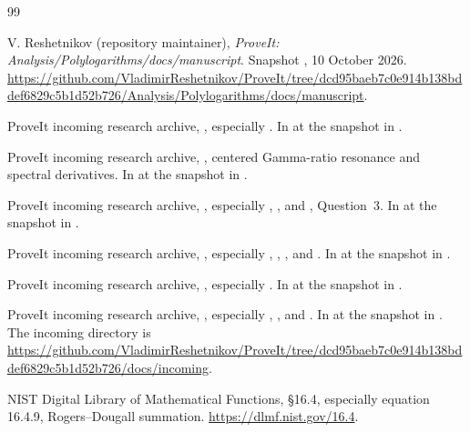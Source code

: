 \begin{thebibliography}{99}
\raggedright
{}

V. Reshetnikov (repository maintainer),
\emph{ProveIt: Analysis/Polylogarithms/docs/manuscript}.
Snapshot ,
10 October 2026.
\url{https://github.com/VladimirReshetnikov/ProveIt/tree/dcd95baeb7c0e914b138bddef6829c5b1d52b726/Analysis/Polylogarithms/docs/manuscript}.

ProveIt incoming research archive,
,
especially .
In  at the snapshot in \cite{RepoMain}.

ProveIt incoming research archive,
,
centered Gamma-ratio resonance and spectral derivatives.
In  at the snapshot in \cite{RepoMain}.

ProveIt incoming research archive,
,
especially ,
, and
, Question~3.
In  at the snapshot in \cite{RepoMain}.

ProveIt incoming research archive,
,
especially ,
, ,
and .
In  at the snapshot in \cite{RepoMain}.

ProveIt incoming research archive,
,
especially .
In  at the snapshot in \cite{RepoMain}.

ProveIt incoming research archive,
,
especially ,
, and
.
In  at the snapshot in \cite{RepoMain}.
The incoming directory is
\url{https://github.com/VladimirReshetnikov/ProveIt/tree/dcd95baeb7c0e914b138bddef6829c5b1d52b726/docs/incoming}.

NIST Digital Library of Mathematical Functions,
\S16.4, especially equation 16.4.9, Rogers--Dougall summation.
\url{https://dlmf.nist.gov/16.4}.


\end{thebibliography}
